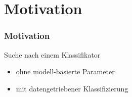 \section{Motivation}

\begin{frame}
	\frametitle{Motivation}
	Suche nach einem Klassifikator 
	\begin{itemize}
		\item ohne modell-basierte Parameter
		\item mit datengetriebener Klassifizierung
	\end{itemize}


\end{frame}
